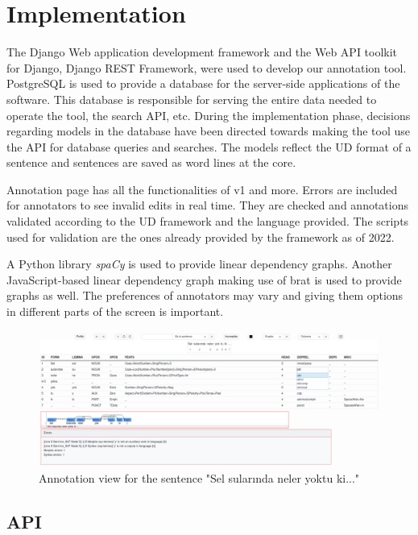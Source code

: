\section{Implementation}
\label{sec:implementation}

The Django\cite{django} Web application development framework and the Web API toolkit for Django, Django REST Framework\cite{drf}, were used to develop our annotation tool.
PostgreSQL\cite{psql} is used to provide a database for the server-side applications of the software.
This database is responsible for serving the entire data needed to operate the tool, the search API, etc.
During the implementation phase, decisions regarding models in the database have been directed towards making the tool use the API for database queries and searches.
The models reflect the UD format of a sentence and sentences are saved as word lines at the core.

Annotation page has all the functionalities of \boat{} v1 and more.
Errors are included for annotators to see invalid edits in real time.
They are checked and annotations validated according to the UD framework and the language provided.
The scripts used for validation are the ones already provided by the framework as of 2022.\cite{UD-git}

A Python library \textit{spaCy}\cite{spacy} is used to provide linear dependency graphs.
Another JavaScript-based linear dependency graph\cite{spyssalo} making use of brat\cite{brat-vis} is used to provide graphs as well.
The preferences of annotators may vary and giving them options in different parts of the screen is important.

\begin{figure}[tbh]
    \centering
    \includegraphics[width=1\textwidth]{figures/1.png}
    \caption{Annotation view for the sentence "Sel sularında neler yoktu ki..."}
    \label{fig:demo-fig}
\end{figure}

\subsection{API}
\label{sec:api}

